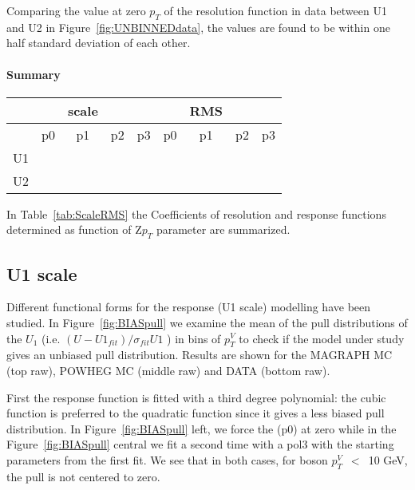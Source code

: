 \documentclass[41pt,a4paper,oneside]{report}
\begin{document}
Comparing the value at zero $p_{T}$  of the resolution function in data between U1 and U2 in Figure~\ref{fig:UNBINNEDdata}, the values are found to be within one half standard deviation of each other.

\paragraph{Summary}

\begin{table*}[tH]
\begin{center}
\caption{Summary of the parameters for the scale ad RMS on the unbinned fit.{\color{magenta}{add data and split the data as runA and runB}}
Those are obtained in the MC.}
\begin{tabular}{l | c c c c | c c c c}
\hline
 &  & scale  &  &  &  & RMS &  & \\
\hline
         & p0 & p1 & p2 & p3 & p0 & p1 & p2 & p3\\
\hline
U1 &  &  &  & &  &  &  & \\
\hline
U2 &  &  &  &  &  &  &  &\\
\hline
\hline
\end{tabular}
    \label{tab:ScaleRMS}
\end{center}
\end{table*}

In Table~\ref{tab:ScaleRMS} the Coefficients of resolution and response functions determined as function of Z$p_{T}$
parameter are summarized.

\subsection{U1 scale}
\label{sec:U1scale}
{\color{magenta}{Need to add the plot on the iter0 - iter1 closure with the errors}}

Different functional forms for the response (U1 scale) modelling have been studied.
In Figure~\ref{fig:BIASpull} we examine the mean of the pull distributions of the $U_{1}$ (i.e. $( U-U1_{fit} )/\sigma_{fit}U1$ ) in bins of $p^{V}_{T}$
to check if the model under study gives an unbiased pull distribution.
Results are shown for the MAGRAPH MC (top raw), POWHEG MC (middle raw) and DATA (bottom raw).

First the response function is fitted with a  third degree polynomial: 
the cubic function is preferred to the quadratic function since it gives a less biased pull distribution. 
In Figure~\ref{fig:BIASpull} left, we force the (p0) at zero while in the Figure~\ref{fig:BIASpull} central we fit a second time with a pol3 with the starting parameters from the first fit.
We see that in both cases, for boson $p^{V}_{T}$~$<$~10 GeV, the pull is not centered to zero. 
\end{document}
